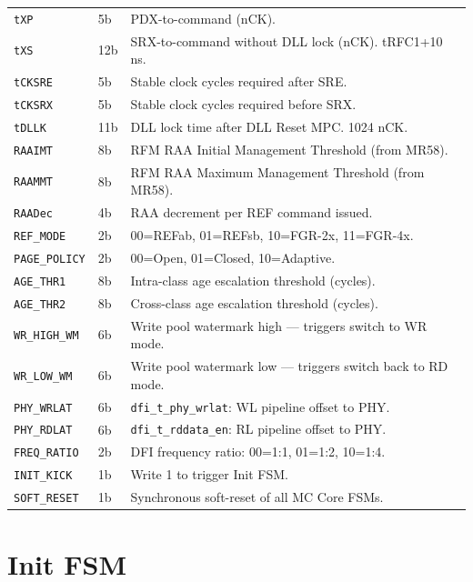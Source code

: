 \documentclass[11pt,a4paper]{article}
\newcommand{\reg}[1]{\textcolor{ddrpurple}{\texttt{#1}}}
\newcommand{\sig}[1]{\textcolor{ddrteal}{\texttt{#1}}}
\begin{document}
\begin{longtable}{L{3cm} C{1.5cm} L{9cm}}
\reg{tXP}           & 5b  & PDX-to-command (nCK). \\
\reg{tXS}           & 12b & SRX-to-command without DLL lock (nCK). tRFC1+10\,ns. \\
\reg{tCKSRE}        & 5b  & Stable clock cycles required after SRE. \\
\reg{tCKSRX}        & 5b  & Stable clock cycles required before SRX. \\
\reg{tDLLK}         & 11b & DLL lock time after DLL Reset MPC. 1024 nCK. \\
\reg{RAAIMT}        & 8b  & RFM RAA Initial Management Threshold (from MR58). \\
\reg{RAAMMT}        & 8b  & RFM RAA Maximum Management Threshold (from MR58). \\
\reg{RAADec}        & 4b  & RAA decrement per REF command issued. \\
\reg{REF\_MODE}     & 2b  & 00=REFab, 01=REFsb, 10=FGR-2x, 11=FGR-4x. \\
\reg{PAGE\_POLICY}  & 2b  & 00=Open, 01=Closed, 10=Adaptive. \\
\reg{AGE\_THR1}     & 8b  & Intra-class age escalation threshold (cycles). \\
\reg{AGE\_THR2}     & 8b  & Cross-class age escalation threshold (cycles). \\
\reg{WR\_HIGH\_WM}  & 6b  & Write pool watermark high --- triggers switch to WR mode. \\
\reg{WR\_LOW\_WM}   & 6b  & Write pool watermark low --- triggers switch back to RD mode. \\
\reg{PHY\_WRLAT}    & 6b  & \sig{dfi\_t\_phy\_wrlat}: WL pipeline offset to PHY. \\
\reg{PHY\_RDLAT}    & 6b  & \sig{dfi\_t\_rddata\_en}: RL pipeline offset to PHY. \\
\reg{FREQ\_RATIO}   & 2b  & DFI frequency ratio: 00=1:1, 01=1:2, 10=1:4. \\
\reg{INIT\_KICK}    & 1b  & Write 1 to trigger Init FSM. \\
\reg{SOFT\_RESET}   & 1b  & Synchronous soft-reset of all MC Core FSMs. \\
\end{longtable}

\section{Init FSM}
\end{document}
